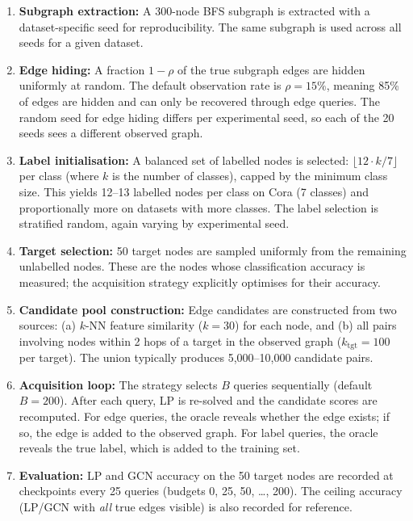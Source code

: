 \documentclass[12pt,a4paper,oneside]{report}
\begin{document}
\begin{enumerate}[leftmargin=2em]
    \item \textbf{Subgraph extraction:} A 300-node BFS subgraph is extracted with a dataset-specific seed for reproducibility. The same subgraph is used across all seeds for a given dataset.
    \item \textbf{Edge hiding:} A fraction $1 - \rho$ of the true subgraph edges are hidden uniformly at random. The default observation rate is $\rho = 15\%$, meaning 85\% of edges are hidden and can only be recovered through edge queries. The random seed for edge hiding differs per experimental seed, so each of the 20 seeds sees a different observed graph.
    \item \textbf{Label initialisation:} A balanced set of labelled nodes is selected: $\lfloor 12 \cdot k / 7 \rfloor$ per class (where $k$ is the number of classes), capped by the minimum class size. This yields 12--13 labelled nodes per class on Cora (7 classes) and proportionally more on datasets with more classes. The label selection is stratified random, again varying by experimental seed.
    \item \textbf{Target selection:} 50 target nodes are sampled uniformly from the remaining unlabelled nodes. These are the nodes whose classification accuracy is measured; the acquisition strategy explicitly optimises for their accuracy.
    \item \textbf{Candidate pool construction:} Edge candidates are constructed from two sources: (a) $k$-NN feature similarity ($k = 30$) for each node, and (b) all pairs involving nodes within 2 hops of a target in the observed graph ($k_{\text{tgt}} = 100$ per target). The union typically produces 5,000--10,000 candidate pairs.
    \item \textbf{Acquisition loop:} The strategy selects $B$ queries sequentially (default $B = 200$). After each query, LP is re-solved and the candidate scores are recomputed. For edge queries, the oracle reveals whether the edge exists; if so, the edge is added to the observed graph. For label queries, the oracle reveals the true label, which is added to the training set.
    \item \textbf{Evaluation:} LP and GCN accuracy on the 50 target nodes are recorded at checkpoints every 25 queries (budgets 0, 25, 50, \ldots, 200). The ceiling accuracy (LP/GCN with \emph{all} true edges visible) is also recorded for reference.
\end{enumerate}
\end{document}
